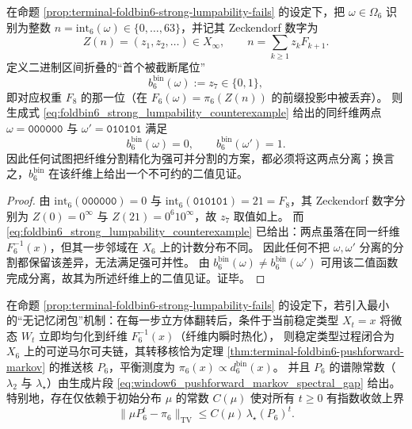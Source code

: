 \begin{corollary}\label{cor:terminal-foldbin6-strong-lumpability-binary-witness}
在命题 \ref{prop:terminal-foldbin6-strong-lumpability-fails} 的设定下，把 \(\omega\in\Omega_6\) 识别为整数 \(n=\mathrm{int}_6(\omega)\in\{0,\dots,63\}\)，并记其 Zeckendorf 数字为
\[
Z(n)=(z_1,z_2,\dots)\in X_\infty,
\qquad
n=\sum_{k\ge 1} z_k F_{k+1}.
\]
定义二进制区间折叠的“首个被截断尾位”
\[
b^{\mathrm{bin}}_6(\omega):=z_{7}\in\{0,1\},
\]
即对应权重 \(F_8\) 的那一位（在 \(F_6(\omega)=\pi_6(Z(n))\) 的前缀投影中被丢弃）。
则生成式 \eqref{eq:foldbin6_strong_lumpability_counterexample} 给出的同纤维两点
\(\omega=\texttt{000000}\) 与 \(\omega'=\texttt{010101}\) 满足
\[
b^{\mathrm{bin}}_6(\omega)=0,\qquad b^{\mathrm{bin}}_6(\omega')=1.
\]
因此任何试图把纤维分割精化为强可并分割的方案，都必须将这两点分离；换言之，\(b^{\mathrm{bin}}_6\) 在该纤维上给出一个不可约的二值见证。
\end{corollary}

\begin{proof}
由 \(\mathrm{int}_6(\texttt{000000})=0\) 与 \(\mathrm{int}_6(\texttt{010101})=21=F_8\)，其 Zeckendorf 数字分别为 \(Z(0)=0^\infty\) 与 \(Z(21)=0^6 1 0^\infty\)，故 \(z_7\) 取值如上。
而 \eqref{eq:foldbin6_strong_lumpability_counterexample} 已给出：两点虽落在同一纤维 \(F_6^{-1}(x)\)，但其一步邻域在 \(X_6\) 上的计数分布不同。
因此任何不把 \(\omega,\omega'\) 分离的分割都保留该差异，无法满足强可并性。
由 \(b^{\mathrm{bin}}_6(\omega)\neq b^{\mathrm{bin}}_6(\omega')\) 可用该二值函数完成分离，故其为所述纤维上的二值见证。证毕。
\end{proof}


\begin{corollary}\label{cor:terminal-foldbin6-minimal-markov-closure-gap}
在命题 \ref{prop:terminal-foldbin6-strong-lumpability-fails} 的设定下，若引入最小的“无记忆闭包”机制：在每一步立方体翻转后，条件于当前稳定类型 \(X_t=x\) 将微态 \(W_t\) 立即均匀化到纤维 \(F_6^{-1}(x)\)（纤维内瞬时热化），
则稳定类型过程闭合为 \(X_6\) 上的可逆马尔可夫链，其转移核恰为定理 \ref{thm:terminal-foldbin6-pushforward-markov} 的推送核 \(P_6\)，平衡测度为 \(\pi_6(x)\propto d^{\mathrm{bin}}_6(x)\)。
并且 \(P_6\) 的谱隙常数（\(\lambda_2\) 与 \(\lambda_\star\)）由生成片段 \eqref{eq:window6_pushforward_markov_spectral_gap} 给出。
特别地，存在仅依赖于初始分布 \(\mu\) 的常数 \(C(\mu)\) 使对所有 \(t\ge 0\) 有指数收敛上界
\[
\|\mu P_6^t-\pi_6\|_{\mathrm{TV}}\le C(\mu)\,\lambda_\star(P_6)^t.
\]
\end{corollary}





